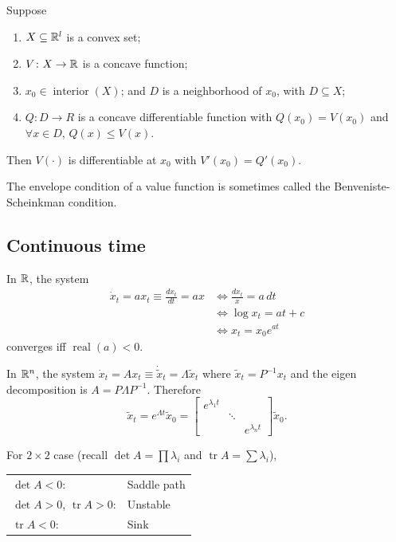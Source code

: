 \documentclass[8pt,letterpaper, landscape]{extarticle} %
\renewcommand{\ln}{\log}
\begin{document}
\begin{multicols}{3}
\begin{description}
 Suppose
\begin{enumerate}
\item $ X \subseteq \mathbb{R}^l $ is a convex set;
\item $ V \colon X \to \mathbb{R} $ is a concave function;
\item $ x_0 \in \operatorname{interior}(X) $; and $ D $ is a neighborhood of $ x_0 $, with $ D \subseteq X $;
\item $ Q \colon D \to R $ is a concave differentiable function with $ Q(x_0) = V(x_0) $ and $ \forall x \in D $, $ Q(x) \leq V(x) $.
\end{enumerate}
Then $ V(\cdot) $ is differentiable at $ x_0 $ with $ V'(x_0) = Q'(x_0) $.

The envelope condition of a value function is sometimes called the Benveniste-Scheinkman condition.

\subsection{Continuous time}
 In $ \mathbb{R} $, the system
\begin{align*}
\dot{x}_t = ax_t \equiv \tfrac{dx_t}{dt} = ax &\iff \tfrac{dx_t}{x} = a \, dt \\
&\iff \ln x_t = at + c \\
&\iff x_t = x_0 e^{at}
\end{align*}
converges iff $ \operatorname{real}(a) < 0 $.

In $ \mathbb{R}^n $, the system $ \dot{x}_t = Ax_t \equiv \dot{\tilde{x}}_t = \Lambda \tilde{x}_t $ where $ \tilde{x}_t = P^{-1} x_t $ and the eigen decomposition is $ A = P \Lambda P^{-1} $. Therefore
$$ \tilde{x}_t = e^{\Lambda t} \tilde{x}_0 = \begin{bmatrix}
e^{\lambda_1 t} & & \\
& \ddots & \\
& & e^{\lambda_n t}
\end{bmatrix} \tilde{x}_0. $$

For $ 2 \times 2 $ case (recall $ \det A = \prod \lambda_i $ and $ \operatorname{tr} A = \sum \lambda_i $),
\begin{center}
\begin{tabular}{ll}
$ \det A < 0 $: & Saddle path \\
$ \det A > 0 $, $ \operatorname{tr} A > 0 $: & Unstable \\
\phantom{$ \det A > 0 $,} $ \operatorname{tr} A < 0 $: & Sink
\end{tabular}
\end{center}


\end{description}
\end{multicols}
\end{document}
